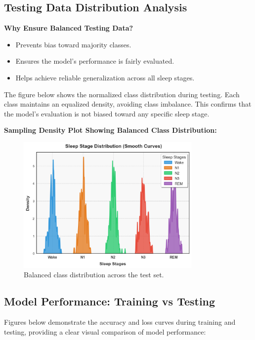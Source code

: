

\subsection{Testing Data Distribution Analysis}

\textbf{Why Ensure Balanced Testing Data?}
\begin{itemize}
    \item Prevents bias toward majority classes.
    \item Ensures the model’s performance is fairly evaluated.
    \item Helps achieve reliable generalization across all sleep stages.
\end{itemize}

The figure below shows the normalized class distribution during testing. Each class maintains an equalized density, avoiding class imbalance. This confirms that the model’s evaluation is not biased toward any specific sleep stage.

\textbf{Sampling Density Plot Showing Balanced Class Distribution:}
\begin{figure}[h!]
    \centering
    \includegraphics[width=0.8\textwidth]{img/sample distribution plot pdf.png}
    \caption{Balanced class distribution across the test set.}
\end{figure}

\subsection{Model Performance: Training vs Testing}

Figures below demonstrate the accuracy and loss curves during training and testing, providing a clear visual comparison of model performance:

